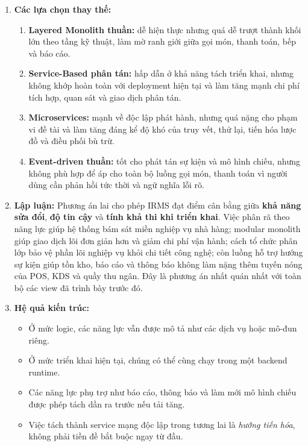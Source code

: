 \documentclass[11pt,a4paper]{article}
\begin{document}
\begin{adrbox}[title={ADR-01: Lựa Chọn Kiến Trúc Lai Cho IRMS}]
\begin{enumerate}[leftmargin=1.9em,label=\arabic*.]
  \item \textbf{Các lựa chọn thay thế:}
  \begin{enumerate}[label=(\alph*),leftmargin=2.1em]
    \item \textbf{Layered Monolith thuần:}
    dễ hiện thực nhưng quá dễ trượt thành khối lớn theo tầng kỹ thuật,
    làm mờ ranh giới giữa gọi món, thanh toán, bếp và báo cáo.
    \item \textbf{Service-Based phân tán:}
    hấp dẫn ở khả năng tách triển khai,
    nhưng không khớp hoàn toàn với deployment hiện tại và làm tăng mạnh chi phí tích hợp, quan sát và giao dịch phân tán.
    \item \textbf{Microservices:}
    mạnh về độc lập phát hành,
    nhưng quá nặng cho phạm vi đề tài và làm tăng đáng kể độ khó của truy vết, thử lại, tiến hóa lược đồ và điều phối bù trừ.
    \item \textbf{Event-driven thuần:}
    tốt cho phát tán sự kiện và mô hình chiếu,
    nhưng không phù hợp để áp cho toàn bộ luồng gọi món, thanh toán vì người dùng cần phản hồi tức thời và ngữ nghĩa lỗi rõ.
  \end{enumerate}

  \item \textbf{Lập luận:}
  Phương án lai cho phép IRMS đạt điểm cân bằng giữa \textbf{khả năng sửa đổi},
  \textbf{độ tin cậy} và \textbf{tính khả thi khi triển khai}.
  Việc phân rã theo năng lực giúp hệ thống bám sát miền nghiệp vụ nhà hàng;
  modular monolith giúp giao dịch lõi đơn giản hơn và giảm chi phí vận hành;
  cách tổ chức phân lớp bảo vệ phần lõi nghiệp vụ khỏi chi tiết công nghệ;
  còn luồng hỗ trợ hướng sự kiện giúp tồn kho, báo cáo và thông báo
  không làm nặng thêm tuyến nóng của POS, KDS và quầy thu ngân.
  Đây là phương án nhất quán nhất với toàn bộ các view đã trình bày trước đó.

  \item \textbf{Hệ quả kiến trúc:}
  \begin{itemize}[leftmargin=1.8em]
    \item Ở mức logic, các năng lực vẫn được mô tả như các dịch vụ hoặc mô-đun riêng.
    \item Ở mức triển khai hiện tại, chúng có thể cùng chạy trong một backend runtime.
    \item Các năng lực phụ trợ như báo cáo, thông báo và làm mới mô hình chiếu được phép tách dần ra trước nếu tải tăng.
    \item Việc tách thành service mạng độc lập trong tương lai là \emph{hướng tiến hóa}, không phải tiền đề bắt buộc ngay từ đầu.
  \end{itemize}


\end{enumerate}
\end{adrbox}
\end{document}
